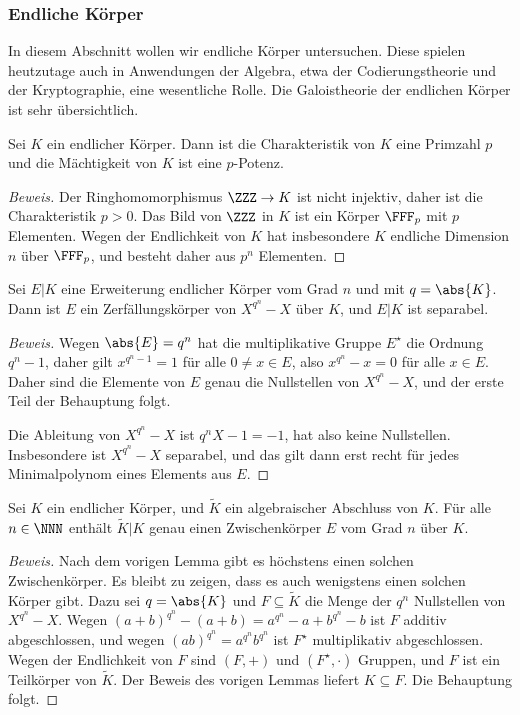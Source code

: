 \documentclass[12pt,a4paper,twoside]{article}
\begin{document}
\subsubsection{Endliche K\"orper}
In diesem Abschnitt wollen wir endliche K\"orper untersuchen. Diese spielen
heutzutage auch in Anwendungen der Algebra, etwa der Codierungstheorie und der
Kryptographie, eine wesentliche Rolle. Die Galoistheorie der endlichen
K\"orper ist sehr \"ubersichtlich.
\begin{Lemma}
  Sei $K$ ein endlicher K\"orper. Dann ist die Charakteristik von $K$ eine
  Primzahl $p$ und die M\"achtigkeit von $K$ ist eine $p$-Potenz.
\end{Lemma}
\begin{proof}[Beweis]
  Der Ringhomomorphismus $\ZZZ\to K$ ist nicht injektiv, daher ist die
  Charakteristik $p>0$. Das Bild von $\ZZZ$ in $K$ ist ein K\"orper $\FFF_p$
  mit $p$ Elementen. Wegen der Endlichkeit von $K$ hat insbesondere $K$
  endliche Dimension $n$ \"uber $\FFF_p$, und besteht daher aus $p^n$
  Elementen.
\end{proof}
\begin{Lemma}
  Sei $E|K$ eine Erweiterung endlicher K\"orper vom Grad $n$ und mit
  $q=\abs{K}$. Dann ist $E$ ein Zerf\"allungsk\"orper von $X^{q^n}-X$ \"uber
  $K$, und $E|K$ ist separabel.
\end{Lemma}
\begin{proof}[Beweis]
  Wegen $\abs{E}=q^n$ hat die multiplikative Gruppe $E^\star$ die Ordnung
  $q^n-1$, daher gilt $x^{q^n-1}=1$ f\"ur alle $0\ne x\in E$, also
  $x^{q^n}-x=0$ f\"ur alle $x\in E$. Daher sind die Elemente von $E$ genau die
  Nullstellen von $X^{q^n}-X$, und der erste Teil der Behauptung folgt.
  
  Die Ableitung von $X^{q^n}-X$ ist $q^nX-1=-1$, hat also keine Nullstellen.
  Insbesondere ist $X^{q^n}-X$ separabel, und das gilt dann erst recht f\"ur
  jedes Minimalpolynom eines Elements aus $E$.
\end{proof}
\begin{Lemma}
  Sei $K$ ein endlicher K\"orper, und $\tilde K$ ein algebraischer Abschluss
  von $K$. F\"ur alle $n\in\NNN$ enth\"alt $\tilde K|K$ genau einen
  Zwischenk\"orper $E$ vom Grad $n$ \"uber $K$.
\end{Lemma}
\begin{proof}[Beweis]
  Nach dem vorigen Lemma gibt es h\"ochstens einen solchen Zwischenk\"orper.
  Es bleibt zu zeigen, dass es auch wenigstens einen solchen K\"orper gibt.
  Dazu sei $q=\abs{K}$ und $F\subseteq\tilde K$ die Menge der $q^n$
  Nullstellen von $X^{q^n}-X$. Wegen $(a+b)^{q^n}-(a+b)=a^{q^n}-a+b^{q^n}-b$
  ist $F$ additiv abgeschlossen, und wegen $(ab)^{q^n}=a^{q^n}b^{q^n}$ ist
  $F^\star$ multiplikativ abgeschlossen. Wegen der Endlichkeit von $F$ sind
  $(F,+)$ und $(F^\star,\cdot)$ Gruppen, und $F$ ist ein Teilk\"orper von
  $\tilde K$. Der Beweis des vorigen Lemmas liefert $K\subseteq F$. Die
  Behauptung folgt.
\end{proof}
\end{document}
